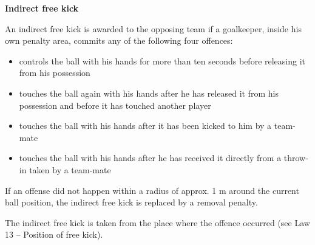 {\bfseries Indirect free kick}

\headlinebox

An indirect free kick is awarded to the opposing team if a goalkeeper, inside his own penalty area, commits any of the following four offences: 

\begin{itemize}
\item controls the ball with his hands for more than ten seconds before releasing it from his possession
\item touches the ball again with his hands after he has released it from his possession and before it has touched another player
\item touches the ball with his hands after it has been  kicked to him by a team-mate
\item touches the ball with his hands after he has received it directly from a throw-in taken by a team-mate
\end{itemize}

\bigskip


If an offense did not happen within a radius of approx. 1 m
around the current ball position, the indirect free kick is replaced by a
removal penalty.


\bigskip

The indirect free kick is taken from the place where the offence occurred (see Law 13 -- Position of free kick). 

\bigskip

